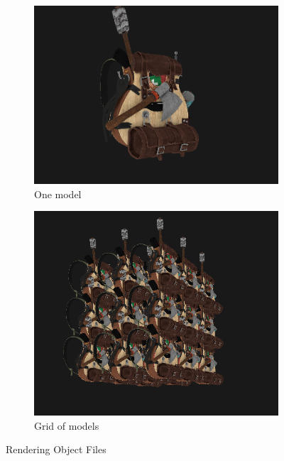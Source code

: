 \documentclass[12pt]{article}
\begin{document}
    \begin{figure}[H]
        \centering
        \begin{subfigure}[b]{0.45\textwidth}
            \centering
            \includegraphics[width=\textwidth]{renderingModels.png}
            \caption{One model}
        \end{subfigure}
        \hfill
        \begin{subfigure}[b]{0.45\textwidth}
            \centering
            \includegraphics[width=\textwidth]{gridOfModels.png}
            \caption{Grid of models}
        \end{subfigure}
        \caption{Rendering Object Files}
    \end{figure}
\end{document}
